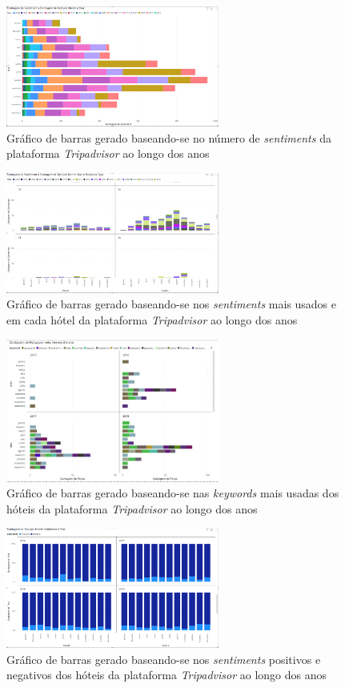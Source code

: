 \begin{figure}[!htb]
\centering
\includegraphics[width=7cm]{figuras/NrReviewsPerYear/TableGraph6.PNG}
\caption{Gráfico de barras gerado baseando-se no número de \textit{sentiments} da plataforma \textit{Tripadvisor} ao longo dos anos}
\label{fig:exemplofig}
\end{figure}

\begin{figure}[!htb]
\centering
\includegraphics[width=7cm]{figuras/NrReviewsPerYear&BusinessType/5.PNG}
\caption{Gráfico de barras gerado baseando-se nos \textit{sentiments} mais usados e em cada hótel da plataforma \textit{Tripadvisor} ao longo dos anos}
\label{fig:exemplofig}
\end{figure}

\begin{figure}[!htb]
\centering
\includegraphics[width=7cm]{figuras/Keyword/keyword mais usadas para cada ano.JPG}
\caption{Gráfico de barras gerado baseando-se nas \textit{keywords} mais usadas dos hóteis da plataforma \textit{Tripadvisor} ao longo dos anos}
\label{fig:exemplofig}
\end{figure}

\begin{figure}[!htb]
\centering
\includegraphics[width=7cm]{figuras/Pos&NegSentiments/TableGraph4.PNG}
\caption{Gráfico de barras gerado baseando-se nos \textit{sentiments} positivos e negativos dos hóteis da plataforma \textit{Tripadvisor} ao longo dos anos}
\label{fig:exemplofig}
\end{figure}

